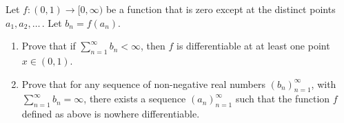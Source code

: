 \documentclass{article}
\begin{document}
	\setlength{\parindent}{0pt}
	Let $f:(0,1)\to[0,\infty)$ be a function that is zero except at the distinct points $a_1,a_2,\dots$\,. Let $b_n=f(a_n)$.
	\begin{enumerate}[label=(\alph*)]
		\item Prove that if $\sum_{n=1}^{\infty} b_n<\infty$, then $f$ is differentiable at at least one point $x\in(0,1)$.
		\item Prove that for any sequence of non-negative real numbers $(b_n)_{n=1}^\infty$, with $\sum_{n=1}^{\infty} b_n=\infty$, there exists a sequence $(a_n)_{n=1}^\infty$ such that the function $f$ defined as above is nowhere differentiable.
	\end{enumerate}
\end{document}
